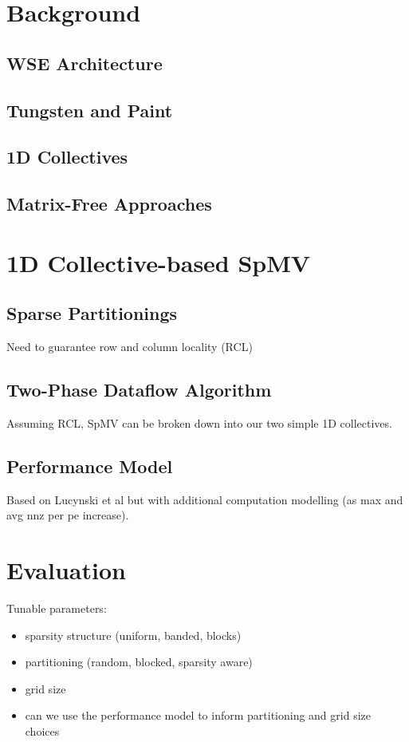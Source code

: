 \documentclass[conference]{IEEEtran}
\begin{document}
\section{Background}
\subsection{WSE Architecture}
\subsection{Tungsten and Paint}
\subsection{1D Collectives}
\subsection{Matrix-Free Approaches}

\section{1D Collective-based SpMV}
\subsection{Sparse Partitionings}
Need to guarantee row and column locality (RCL)
\subsection{Two-Phase Dataflow Algorithm}
Assuming RCL, SpMV can be broken down into our two simple 1D collectives.
\subsection{Performance Model}
Based on Lucynski et al but with additional computation modelling (as max and avg nnz per pe increase).
\section{Evaluation}
Tunable parameters:
\begin{itemize}
    \item sparsity structure (uniform, banded, blocks)
    \item partitioning (random, blocked, sparsity aware)
    \item grid size
    \item can we use the performance  model to inform partitioning and grid size choices
\end{itemize}
\end{document}

